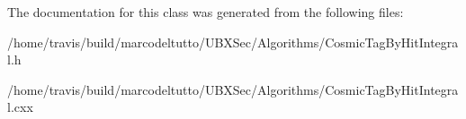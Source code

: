 The documentation for this class was generated from the following files\-:\begin{DoxyCompactItemize}
\item 
/home/travis/build/marcodeltutto/\-U\-B\-X\-Sec/\-Algorithms/Cosmic\-Tag\-By\-Hit\-Integral.\-h\item 
/home/travis/build/marcodeltutto/\-U\-B\-X\-Sec/\-Algorithms/Cosmic\-Tag\-By\-Hit\-Integral.\-cxx\end{DoxyCompactItemize}
